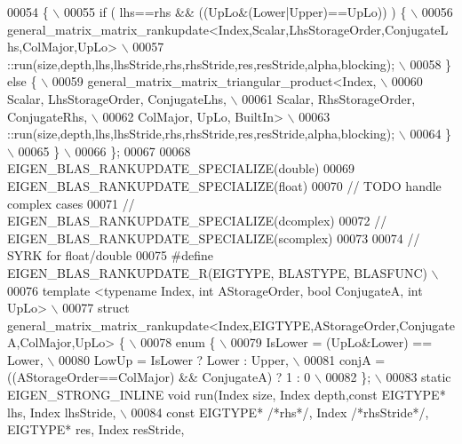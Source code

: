 \begin{DoxyCode}
00054 \textcolor{preprocessor}{  \{ \(\backslash\)}
00055 \textcolor{preprocessor}{    if ( lhs==rhs && ((UpLo&(Lower|Upper)==UpLo)) ) \{ \(\backslash\)}
00056 \textcolor{preprocessor}{      general\_matrix\_matrix\_rankupdate<Index,Scalar,LhsStorageOrder,ConjugateLhs,ColMajor,UpLo> \(\backslash\)}
00057 \textcolor{preprocessor}{      ::run(size,depth,lhs,lhsStride,rhs,rhsStride,res,resStride,alpha,blocking); \(\backslash\)}
00058 \textcolor{preprocessor}{    \} else \{ \(\backslash\)}
00059 \textcolor{preprocessor}{      general\_matrix\_matrix\_triangular\_product<Index, \(\backslash\)}
00060 \textcolor{preprocessor}{        Scalar, LhsStorageOrder, ConjugateLhs, \(\backslash\)}
00061 \textcolor{preprocessor}{        Scalar, RhsStorageOrder, ConjugateRhs, \(\backslash\)}
00062 \textcolor{preprocessor}{        ColMajor, UpLo, BuiltIn> \(\backslash\)}
00063 \textcolor{preprocessor}{      ::run(size,depth,lhs,lhsStride,rhs,rhsStride,res,resStride,alpha,blocking); \(\backslash\)}
00064 \textcolor{preprocessor}{    \} \(\backslash\)}
00065 \textcolor{preprocessor}{  \} \(\backslash\)}
00066 \textcolor{preprocessor}{\};}
00067 
00068 EIGEN\_BLAS\_RANKUPDATE\_SPECIALIZE(\textcolor{keywordtype}{double})
00069 EIGEN\_BLAS\_RANKUPDATE\_SPECIALIZE(\textcolor{keywordtype}{float})
00070 \textcolor{comment}{// TODO handle complex cases}
00071 \textcolor{comment}{// EIGEN\_BLAS\_RANKUPDATE\_SPECIALIZE(dcomplex)}
00072 \textcolor{comment}{// EIGEN\_BLAS\_RANKUPDATE\_SPECIALIZE(scomplex)}
00073 
00074 \textcolor{comment}{// SYRK for float/double}
00075 \textcolor{preprocessor}{#define EIGEN\_BLAS\_RANKUPDATE\_R(EIGTYPE, BLASTYPE, BLASFUNC) \(\backslash\)}
00076 \textcolor{preprocessor}{template <typename Index, int AStorageOrder, bool ConjugateA, int  UpLo> \(\backslash\)}
00077 \textcolor{preprocessor}{struct general\_matrix\_matrix\_rankupdate<Index,EIGTYPE,AStorageOrder,ConjugateA,ColMajor,UpLo> \{ \(\backslash\)}
00078 \textcolor{preprocessor}{  enum \{ \(\backslash\)}
00079 \textcolor{preprocessor}{    IsLower = (UpLo&Lower) == Lower, \(\backslash\)}
00080 \textcolor{preprocessor}{    LowUp = IsLower ? Lower : Upper, \(\backslash\)}
00081 \textcolor{preprocessor}{    conjA = ((AStorageOrder==ColMajor) && ConjugateA) ? 1 : 0 \(\backslash\)}
00082 \textcolor{preprocessor}{  \}; \(\backslash\)}
00083 \textcolor{preprocessor}{  static EIGEN\_STRONG\_INLINE void run(Index size, Index depth,const EIGTYPE* lhs, Index lhsStride, \(\backslash\)}
00084 \textcolor{preprocessor}{                          const EIGTYPE* }\textcolor{comment}{/*rhs*/}\textcolor{preprocessor}{, Index }\textcolor{comment}{/*rhsStride*/}\textcolor{preprocessor}{, EIGTYPE* res, Index resStride,
}
\end{DoxyCode}
